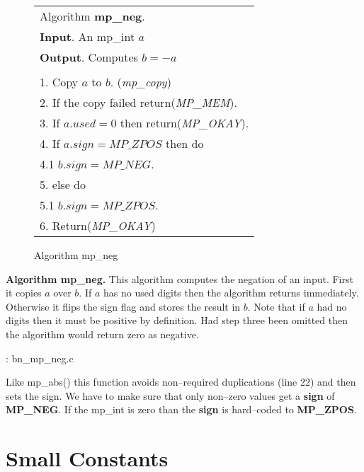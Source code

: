 \documentclass[b5paper]{book}
\begin{document}
\begin{figure}[here]
\begin{center}
\begin{tabular}{l}
\hline Algorithm \textbf{mp\_neg}. \\
\textbf{Input}.   An mp\_int $a$ \\
\textbf{Output}.  Computes $b = -a$ \\
\hline \\
1.  Copy $a$ to $b$.  (\textit{mp\_copy}) \\
2.  If the copy failed return(\textit{MP\_MEM}). \\
3.  If $a.used = 0$ then return(\textit{MP\_OKAY}). \\
4.  If $a.sign = MP\_ZPOS$ then do \\
\hspace{3mm}4.1  $b.sign = MP\_NEG$. \\
5.  else do \\
\hspace{3mm}5.1  $b.sign = MP\_ZPOS$. \\
6.  Return(\textit{MP\_OKAY}) \\
\hline
\end{tabular}
\end{center}
\caption{Algorithm mp\_neg}
\end{figure}

\textbf{Algorithm mp\_neg.}
This algorithm computes the negation of an input.  First it copies $a$ over $b$.  If $a$ has no used digits then
the algorithm returns immediately.  Otherwise it flips the sign flag and stores the result in $b$.  Note that if 
$a$ had no digits then it must be positive by definition.  Had step three been omitted then the algorithm would return
zero as negative.

\vspace{+3mm}\begin{small}
\hspace{-5.1mm}{\bf File}: bn\_mp\_neg.c
\vspace{-3mm}
\begin{alltt}
\end{alltt}
\end{small}

Like mp\_abs() this function avoids non--required duplications (line 22) and then sets the sign.  We
have to make sure that only non--zero values get a \textbf{sign} of \textbf{MP\_NEG}.  If the mp\_int is zero
than the \textbf{sign} is hard--coded to \textbf{MP\_ZPOS}.

\section{Small Constants}
\end{document}
